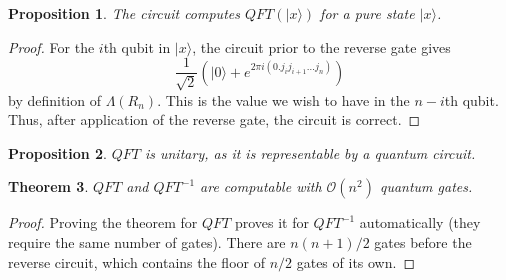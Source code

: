 \documentclass{amsart}
\newtheorem{theorem}{Theorem}[section]
\newtheorem{proposition}[theorem]{Proposition}
\theoremstyle{definition}
\theoremstyle{remark}
\newcommand{\ket}[1] {|#1\rangle}
\begin{document}
\begin{center}
\end{center}

\begin{proposition}
    The circuit computes $\mathit{QFT}(\ket{x})$ for a pure state $\ket{x}$.
\end{proposition}

\begin{proof}
    For the $i$th qubit in $\ket{x}$, the circuit prior to the reverse gate
    gives
    \[
        \frac{1}{\sqrt{2}} \left( \ket{0} + e^{2\pi i (0.j_i j_{i+1} \dots
                j_{n})}\right)
    \]
    by definition of $\Lambda(R_n)$. This is the value we wish to have in the
    $n-i$th qubit. Thus, after application of the reverse gate, the circuit is
    correct.
\end{proof}

\begin{proposition}
    $\mathit{QFT}$ is unitary, as it is representable by a quantum circuit.
\end{proposition}

\begin{theorem}
    $\mathit{QFT}$ and $\mathit{QFT}^{-1}$ are computable with
    $\mathcal{O}(n^2)$ quantum gates.
\end{theorem}

\begin{proof}
    Proving the theorem for $\mathit{QFT}$ proves it for $\mathit{QFT}^{-1}$
    automatically (they require the same number of gates). There are $n(n+1)/2$
    gates before the reverse circuit, which contains the floor of $n/2$ gates of
    its own.
\end{proof}
\end{document}
